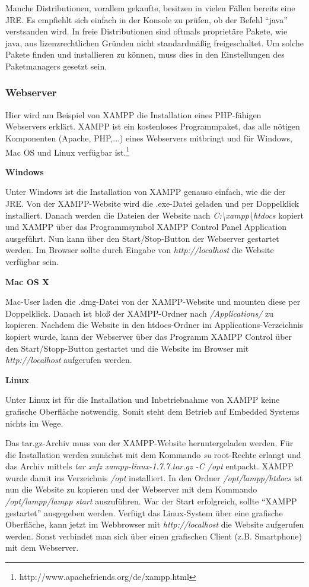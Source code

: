 \documentclass[a4paper,14pt,headsepline]{scrartcl}
\begin{document}
Manche Distributionen, vorallem gekaufte, besitzen in vielen Fällen bereits eine JRE. Es empfiehlt sich einfach in der Konsole zu prüfen, ob der Befehl ``java'' verstsanden wird. In freie Distributionen sind oftmals proprietäre Pakete, wie java, aus lizenzrechtlichen Gründen nicht standardmäßig freigeschaltet. Um solche Pakete finden und installieren zu können, muss dies in den Einstellungen des Paketmanagers gesetzt sein.  

\newpage

\subsubsection{Webserver}
Hier wird am Beispiel von XAMPP die Installation eines PHP-fähigen Webservers erklärt. XAMPP ist ein kostenloses Programmpaket, das alle nötigen Komponenten (Apache, PHP,...) eines Webservers mitbringt und für Windows, Mac OS und Linux verfügbar ist.\footnote{http://www.apachefriends.org/de/xampp.html} 

\textbf{Windows}

Unter Windows ist die Installation von XAMPP genauso einfach, wie die der JRE. Von der XAMPP-Website wird die .exe-Datei geladen und per Doppelklick installiert. Danach werden die Dateien der Website nach \textit{C:\textbackslash xampp\textbackslash htdocs} kopiert und XAMPP über das Programmsymbol XAMPP Control Panel Application ausgeführt. Nun kann über den Start/Stop-Button der Webserver gestartet werden. Im Browser sollte durch Eingabe von \textit{http://localhost} die Website verfügbar sein. 

\textbf{Mac OS X}

Mac-User laden die .dmg-Datei von der XAMPP-Website und mounten diese per Doppelklick. Danach ist bloß der XAMPP-Ordner nach \textit{/Applications/} zu kopieren. Nachdem die Website in den htdocs-Ordner im Applications-Verzeichnis kopiert wurde, kann der Webserver über das Programm XAMPP Control über den Start/Stopp-Button gestartet und die Website im Browser mit \textit{http://localhost} aufgerufen werden. 

\newpage

\textbf{Linux}

Unter Linux ist für die Installation und Inbetriebnahme von XAMPP keine grafische Oberfläche notwendig. Somit steht dem Betrieb auf Embedded Systems nichts im Wege. 

Das tar.gz-Archiv muss von der XAMPP-Website heruntergeladen werden. Für die Installation werden zunächst mit dem Kommando \textit{su} root-Rechte erlangt und das Archiv mittels \textit{tar xvfz xampp-linux-1.7.7.tar.gz -C /opt} entpackt. XAMPP wurde damit ins Verzeichnis \textit{/opt} installiert. In den Ordner \linebreak \textit{/opt/lampp/htdocs} ist nun die Website zu kopieren und der Webserver mit dem Kommando \textit{/opt/lampp/lampp start} auszuführen. War der Start erfolgreich, sollte ``XAMPP gestartet'' ausgegeben werden. Verfügt das Linux-System über eine grafische Oberfläche, kann jetzt im Webbrowser mit \textit{http://localhost} die Website aufgerufen werden. Sonst verbindet man sich über einen grafischen Client (z.B. Smartphone) mit dem Webserver.
 
\end{document}
